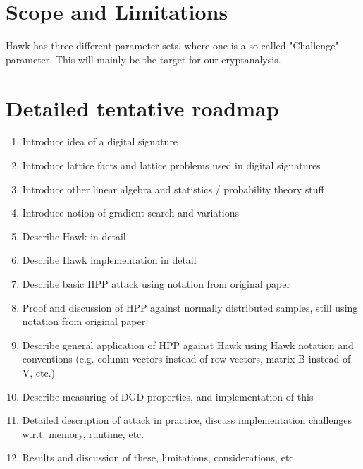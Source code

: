 \section{Scope and Limitations}
Hawk has three different parameter sets, where one is a so-called "Challenge" parameter. This will mainly be the target for our cryptanalysis.

\section{Detailed tentative roadmap}
\begin{enumerate}
    \item Introduce idea of a digital signature
    \item Introduce lattice facts and lattice problems used in digital signatures
    \item Introduce other linear algebra and statistics / probability theory stuff
    \item Introduce notion of gradient search and variations
    \item Describe Hawk in detail
    \item Describe Hawk implementation in detail
    \item Describe basic HPP attack using notation from original paper
    \item Proof and discussion of HPP against normally distributed samples, still using notation from original paper
    \item Describe general application of HPP against Hawk using Hawk notation and conventions (e.g. column vectors instead of row vectors,
        matrix B instead of V, etc.)
    \item Describe measuring of DGD properties, and implementation of this
    \item Detailed description of attack in practice, discuss implementation challenges w.r.t. memory, runtime, etc.
    \item Results and discussion of these, limitations, considerations, etc.
\end{enumerate}

